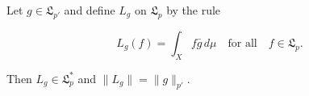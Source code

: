 Let $g \in \mathfrak{L}_{p'}$ and define $L_g$ on $\mathfrak{L}_p$ by the rule

$$L_g(f) = \int_X f \bar{g} \, d\mu \quad \text{for all} \quad f \in \mathfrak{L}_p.$$

Then $L_g \in \mathfrak{L}_p^*$ and $\|L_g\| = \|g\|_{p'}$.